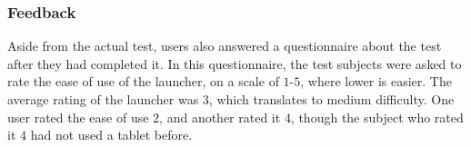 \subsubsection{Feedback}
Aside from the actual test, users also answered a questionnaire about the test after they had completed it. 
In this questionnaire, the test subjects were asked to rate the ease of use of the launcher, on a scale of $1$-$5$, where lower is easier. 
The average rating of the launcher was $3$, which translates to medium difficulty. 
One user rated the ease of use $2$, and another rated it $4$, though the subject who rated it $4$ had not used a tablet before. \newline

